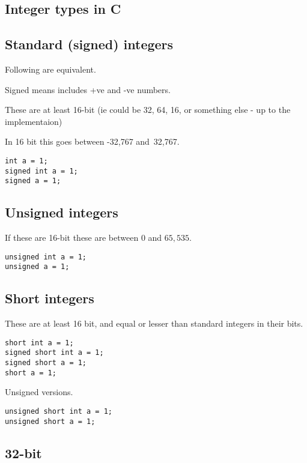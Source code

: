 
\subsection{Integer types in C}

\subsection{Standard (signed) integers}

Following are equivalent.

Signed means includes +ve and -ve numbers.

These are at least 16-bit (ie could be 32, 64, 16, or something else - up to the implementaion)

In 16 bit this goes between -32,767 and 32,767.

\begin{verbatim}
int a = 1;
signed int a = 1;
signed a = 1;
\end{verbatim}

\subsection{Unsigned integers}

If these are 16-bit these are between \(0\) and \(65,535\).
 
\begin{verbatim}
unsigned int a = 1;
unsigned a = 1;
\end{verbatim}

\subsection{Short integers}

These are at least 16 bit, and equal or lesser than standard integers in their bits.

\begin{verbatim}
short int a = 1;
signed short int a = 1;
signed short a = 1;
short a = 1;
\end{verbatim}

Unsigned versions.

\begin{verbatim}
unsigned short int a = 1;
unsigned short a = 1;
\end{verbatim}

\subsection{32-bit}

